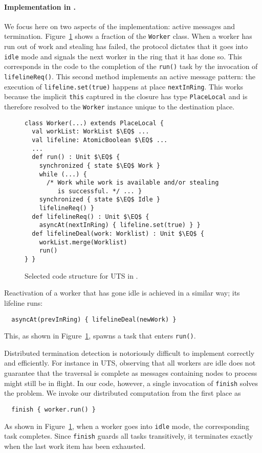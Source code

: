 \paragraph{Implementation in \apgas.} We focus here on two aspects of the
implementation: active messages and termination. Figure~\ref{fig:utsapgas}
shows a fraction of the \lstinline{Worker} class.
When a worker has run out of work and stealing has failed, the protocol
dictates that it goes into \lstinline{idle} mode and signals the next worker in
the ring that it has done so. This corresponds in the code to the completion of
the \lstinline{run()} task by the invocation of \lstinline{lifelineReq()}. This
second method implements an active message pattern: the execution of
\lstinline{lifeline.set(true)} happens at place \lstinline{nextInRing}. This
works because the implicit \lstinline{this} captured in the closure has type
\lstinline{PlaceLocal} and is therefore resolved to the \lstinline{Worker}
instance unique to the destination place.
\begin{figure}
\begin{lstlisting}
class Worker(...) extends PlaceLocal {
  val workList: WorkList $\EQ$ ...
  val lifeline: AtomicBoolean $\EQ$ ...
  ...
  def run() : Unit $\EQ$ {
    synchronized { state $\EQ$ Work }
    while (...) {
      /* Work while work is available and/or stealing
         is successful. */ ... }
    synchronized { state $\EQ$ Idle }
    lifelineReq() }
  def lifelineReq() : Unit $\EQ$ {
    asyncAt(nextInRing) { lifeline.set(true) } }
  def lifelineDeal(work: Worklist) : Unit $\EQ$ {
    workList.merge(Worklist)
    run()
} }
\end{lstlisting}
\caption{Selected code structure for UTS in \apgas.\label{fig:utsapgas}}
\end{figure}
Reactivation of a worker that has gone idle is achieved in a similar way; its
lifeline runs:
\begin{lstlisting}
  asyncAt(prevInRing) { lifelineDeal(newWork) }
\end{lstlisting}
This, as shown in Figure~\ref{fig:utsapgas}, spawns a task that enters
\lstinline{run()}.

Distributed termination detection is notoriously difficult to implement
correctly and efficiently. For instance in UTS, observing that all workers are
idle does not guarantee that the traversal is complete as messages containing
nodes to process might still be in flight. In our code, however, a single
invocation of \lstinline{finish} solves the problem.
We invoke our distributed computation from the first place as
\begin{lstlisting}
  finish { worker.run() }
\end{lstlisting}
As shown in Figure~\ref{fig:utsapgas}, when a worker goes into \lstinline{idle}
mode, the corresponding task completes. Since \lstinline{finish} guards all
tasks transitively, it terminates exactly when the last work item has been
exhausted.

